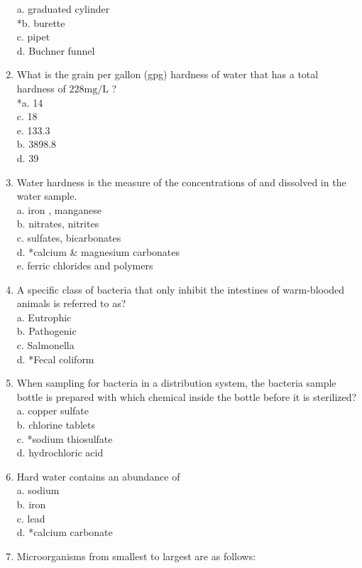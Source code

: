 \begin{enumerate}[1.]
a. graduated cylinder\\
*b. burette\\
c. pipet\\
d. Buchner funnel\\
\item What is the grain per gallon (gpg) hardness of water that has a total hardness of $228 \mathrm{mg} / \mathrm{L}$ ?\\
*a. 14\\
c. 18\\
e. 133.3\\
b. 3898.8\\
d. 39\\
\item Water hardness is the measure of the concentrations of and dissolved in the water sample.\\
a. iron , manganese\\
b. nitrates, nitrites\\
c. sulfates, bicarbonates\\
d. *calcium \& magnesium carbonates\\
e. ferric chlorides and polymers\\
\item A specific class of bacteria that only inhibit the intestines of warm-blooded animals is referred to as?\\
a. Eutrophic\\
b. Pathogenic\\
c. Salmonella\\
d. *Fecal coliform\\
\item When sampling for bacteria in a distribution system, the bacteria sample bottle is prepared with which chemical inside the bottle before it is sterilized?\\
a. copper sulfate\\
b. chlorine tablets\\
c. *sodium thiosulfate\\
d. hydrochloric acid\\
\item Hard water contains an abundance of\\
a. sodium\\
b. iron\\
c. lead\\
d. *calcium carbonate\\
\item Microorganisms from smallest to largest are as follows:\\

\end{enumerate}
